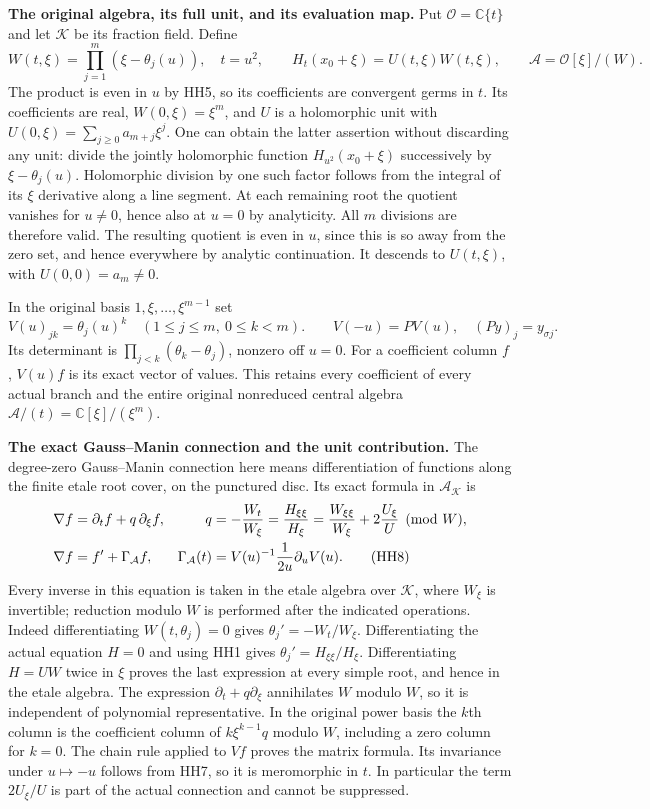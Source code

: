 \documentclass[11pt,a4paper]{article}
\theoremstyle{definition}\newtheorem{definition}[theorem]{Definition}
\begin{document}
\HH\textbf{The original algebra, its full unit, and its evaluation map.}
Put $\mathcal O=\mathbb C\{t\}$ and let $\mathcal K$ be its fraction field.
Define
\[
 W(t,\xi)=\prod_{j=1}^m(\xi-\theta_j(u)),\quad t=u^2,\qquad
 H_t(x_0+\xi)=U(t,\xi)W(t,\xi),\qquad
 \mathcal A=\mathcal O[\xi]/(W).
 \tag{HH6}\label{hh:original-algebra}
\]
The product is even in $u$ by HH5, so its coefficients are
convergent germs in $t$. Its coefficients are real, $W(0,\xi)=\xi^m$,
and $U$ is a holomorphic unit with
$U(0,\xi)=\sum_{j\ge0}a_{m+j}\xi^j$.
One can obtain the latter assertion without discarding any unit:
divide the jointly holomorphic function $H_{u^2}(x_0+\xi)$ successively
by $\xi-\theta_j(u)$. Holomorphic division by one such factor follows
from the integral of its $\xi$ derivative along a line segment.
At each remaining root the quotient vanishes for $u\ne0$, hence
also at $u=0$ by analyticity. All $m$ divisions are therefore valid.
The resulting quotient is even in $u$, since this is so away from
the zero set, and hence everywhere by analytic continuation.
It descends to $U(t,\xi)$, with $U(0,0)=a_m\ne0$.

In the original basis $1,\xi,\ldots,\xi^{m-1}$ set
\[
 V(u)_{jk}=\theta_j(u)^k\quad(1\le j\le m,\ 0\le k<m).
 \qquad V(-u)=P V(u),\quad
 (Py)_j=y_{\sigma j}.
 \tag{HH7}\label{hh:vandermonde}
\]
Its determinant is $\prod_{j<k}(\theta_k-\theta_j)$, nonzero off $u=0$.
For a coefficient column $f$, $V(u)f$ is its exact vector of values.
This retains every coefficient of every actual branch and the entire
original nonreduced central algebra
$\mathcal A/(t)=\mathbb C[\xi]/(\xi^m)$.

\HH\textbf{The exact Gauss--Manin connection and the unit contribution.}
The degree-zero Gauss--Manin connection here means differentiation
of functions along the finite etale root cover, on the punctured
disc. Its exact formula in $\mathcal A_{\mathcal K}$ is
\begin{align}
 \nabla f&=\partial_tf+q\,\partial_\xi f,&
 q&=-\frac{W_t}{W_\xi}
   =\frac{H_{\xi\xi}}{H_\xi}
   =\frac{W_{\xi\xi}}{W_\xi}+2\frac{U_\xi}{U}\pmod W, \notag\\
 \nabla f&=f'+\Gamma_{\mathcal A}f,&
 \Gamma_{\mathcal A}(t)&=
     V(u)^{-1}\frac1{2u}\partial_u V(u).
 \tag{HH8}\label{hh:connection}
\end{align}
Every inverse in this equation is taken in the etale algebra over
$\mathcal K$, where $W_\xi$ is invertible; reduction modulo $W$ is
performed after the indicated operations.
Indeed differentiating $W(t,\theta_j)=0$ gives
$\theta_j'=-W_t/W_\xi$. Differentiating the actual equation $H=0$
and using HH1 gives $\theta_j'=H_{\xi\xi}/H_\xi$.
Differentiating $H=UW$ twice in $\xi$ proves the last expression
at every simple root, and hence in the etale algebra.
The expression $\partial_t+q\partial_\xi$ annihilates $W$ modulo $W$,
so it is independent of polynomial representative.
In the original power basis the $k$th column is the coefficient
column of $k\xi^{k-1}q$ modulo $W$, including a zero column for $k=0$.
The chain rule applied to $Vf$ proves the matrix formula.
Its invariance under $u\mapsto-u$ follows from HH7, so it is
meromorphic in $t$. In particular the term $2U_\xi/U$ is part of
the actual connection and cannot be suppressed.
\end{document}
